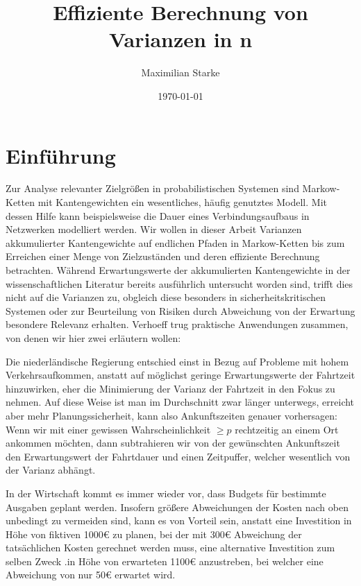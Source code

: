 \documentclass[a4paper]{article}
\title{Effiziente Berechnung von Varianzen in \mc{}n}%
\author{Maximilian Starke}
\affil{Fakultät für Informatik, Technische Universität Dresden}
\date{\today}
\newcommand{\mc}{Markow-Kette}
\theoremstyle{nonumberplain}
\begin{document}
\maketitle
\vspace{3em}
\tableofcontents
\pagebreak

\section{Einführung}

Zur Analyse relevanter Zielgrößen in probabilistischen Systemen sind \mc{}n mit Kantengewichten ein wesentliches, häufig genutztes Modell. Mit dessen Hilfe kann beispielsweise die Dauer eines Verbindungsaufbaus in Netzwerken modelliert werden. Wir wollen in dieser Arbeit Varianzen akkumulierter Kantengewichte auf endlichen Pfaden in \mc{}n bis zum Erreichen einer Menge von Zielzuständen und deren effiziente Berechnung betrachten.
Während Erwartungswerte der akkumulierten Kantengewichte in der wissenschaftlichen Literatur bereits ausführlich untersucht worden sind, trifft dies nicht auf die Varianzen zu, obgleich diese besonders in sicherheitskritischen Systemen oder zur Beurteilung von Risiken durch Abweichung von der Erwartung besondere Relevanz erhalten.
Verhoeff \cite{Verh04} trug praktische Anwendungen zusammen, von denen wir hier zwei erläutern wollen:

Die niederländische Regierung entschied einst in Bezug auf Probleme mit hohem Verkehrsaufkommen, anstatt auf möglichst geringe Erwartungswerte der Fahrtzeit hinzuwirken, eher die Minimierung der Varianz der Fahrtzeit in den Fokus zu nehmen. Auf diese Weise ist man im Durchschnitt zwar länger unterwegs, erreicht aber mehr Planungssicherheit, kann also Ankunftszeiten genauer vorhersagen:
Wenn wir mit einer gewissen Wahrscheinlichkeit $\geq p$ rechtzeitig an einem Ort ankommen möchten, dann subtrahieren wir von der gewünschten Ankunftszeit den Erwartungswert der Fahrtdauer und einen Zeitpuffer, welcher wesentlich von der Varianz abhängt.

In der Wirtschaft kommt es immer wieder vor, dass Budgets für bestimmte Ausgaben geplant werden. Insofern größere Abweichungen der Kosten nach oben unbedingt zu vermeiden sind, kann es von Vorteil sein, anstatt eine Investition in Höhe von fiktiven 1000\euro{} zu planen, bei der mit 300\euro{} Abweichung der tatsächlichen Kosten gerechnet werden muss, eine alternative Investition zum selben Zweck .in Höhe von erwarteten 1100\euro{} anzustreben, bei welcher eine Abweichung von nur 50\euro{} erwartet wird.
\end{document}
